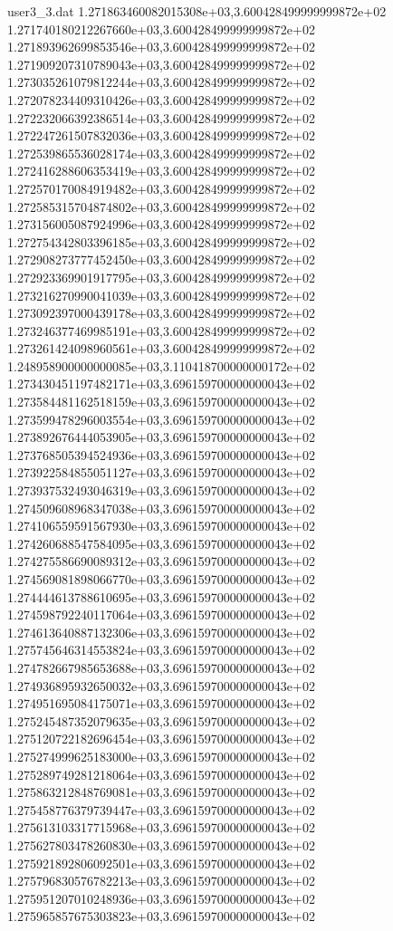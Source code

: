 \begin{filecontents}{user3_3.dat}
1.271863460082015308e+03,3.600428499999999872e+02
1.271740180212267660e+03,3.600428499999999872e+02
1.271893962699853546e+03,3.600428499999999872e+02
1.271909207310789043e+03,3.600428499999999872e+02
1.273035261079812244e+03,3.600428499999999872e+02
1.272078234409310426e+03,3.600428499999999872e+02
1.272232066392386514e+03,3.600428499999999872e+02
1.272247261507832036e+03,3.600428499999999872e+02
1.272539865536028174e+03,3.600428499999999872e+02
1.272416288606353419e+03,3.600428499999999872e+02
1.272570170084919482e+03,3.600428499999999872e+02
1.272585315704874802e+03,3.600428499999999872e+02
1.273156005087924996e+03,3.600428499999999872e+02
1.272754342803396185e+03,3.600428499999999872e+02
1.272908273777452450e+03,3.600428499999999872e+02
1.272923369901917795e+03,3.600428499999999872e+02
1.273216270990041039e+03,3.600428499999999872e+02
1.273092397000439178e+03,3.600428499999999872e+02
1.273246377469985191e+03,3.600428499999999872e+02
1.273261424098960561e+03,3.600428499999999872e+02
1.248958900000000085e+03,3.110418700000000172e+02
1.273430451197482171e+03,3.696159700000000043e+02
1.273584481162518159e+03,3.696159700000000043e+02
1.273599478296003554e+03,3.696159700000000043e+02
1.273892676444053905e+03,3.696159700000000043e+02
1.273768505394524936e+03,3.696159700000000043e+02
1.273922584855051127e+03,3.696159700000000043e+02
1.273937532493046319e+03,3.696159700000000043e+02
1.274509608968347038e+03,3.696159700000000043e+02
1.274106559591567930e+03,3.696159700000000043e+02
1.274260688547584095e+03,3.696159700000000043e+02
1.274275586690089312e+03,3.696159700000000043e+02
1.274569081898066770e+03,3.696159700000000043e+02
1.274444613788610695e+03,3.696159700000000043e+02
1.274598792240117064e+03,3.696159700000000043e+02
1.274613640887132306e+03,3.696159700000000043e+02
1.275745646314553824e+03,3.696159700000000043e+02
1.274782667985653688e+03,3.696159700000000043e+02
1.274936895932650032e+03,3.696159700000000043e+02
1.274951695084175071e+03,3.696159700000000043e+02
1.275245487352079635e+03,3.696159700000000043e+02
1.275120722182696454e+03,3.696159700000000043e+02
1.275274999625183000e+03,3.696159700000000043e+02
1.275289749281218064e+03,3.696159700000000043e+02
1.275863212848769081e+03,3.696159700000000043e+02
1.275458776379739447e+03,3.696159700000000043e+02
1.275613103317715968e+03,3.696159700000000043e+02
1.275627803478260830e+03,3.696159700000000043e+02
1.275921892806092501e+03,3.696159700000000043e+02
1.275796830576782213e+03,3.696159700000000043e+02
1.275951207010248936e+03,3.696159700000000043e+02
1.275965857675303823e+03,3.696159700000000043e+02

\end{filecontents}
